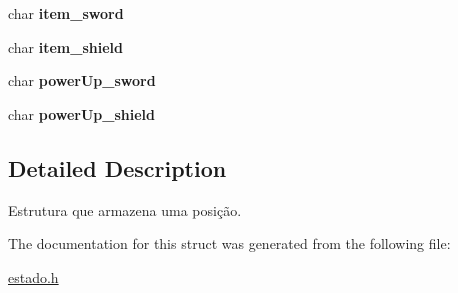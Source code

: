 \begin{DoxyCompactItemize}
\item 
char {\bfseries item\+\_\+sword}\hypertarget{structplayerState_af40c994255ce3468e9e10d28e72695d1}{}\label{structplayerState_af40c994255ce3468e9e10d28e72695d1}

\item 
char {\bfseries item\+\_\+shield}\hypertarget{structplayerState_a1018720970139637d117df31f7d4dd29}{}\label{structplayerState_a1018720970139637d117df31f7d4dd29}

\item 
char {\bfseries power\+Up\+\_\+sword}\hypertarget{structplayerState_aeb6a2ff9056c0fa02cee9cec4525218d}{}\label{structplayerState_aeb6a2ff9056c0fa02cee9cec4525218d}

\item 
char {\bfseries power\+Up\+\_\+shield}\hypertarget{structplayerState_a6b82f2a1a55915328bfca30d425cc7de}{}\label{structplayerState_a6b82f2a1a55915328bfca30d425cc7de}

\end{DoxyCompactItemize}


\subsection{Detailed Description}
Estrutura que armazena uma posição. 

The documentation for this struct was generated from the following file\+:\begin{DoxyCompactItemize}
\item 
\hyperlink{estado_8h}{estado.\+h}\end{DoxyCompactItemize}
